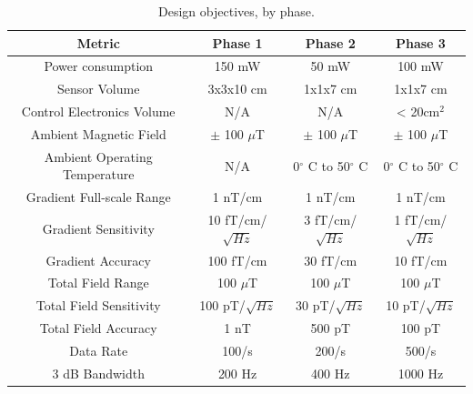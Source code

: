 \begin{table}[h!]
\centering
  \begin{tabular}{|c||c|c|c|}
    \hline
    Metric & Phase 1 & Phase 2 & Phase 3 \\
    \hline
    \hline
    Power consumption & 150 mW & 50 mW & 100 mW \\
    \hline
    Sensor Volume & 3x3x10 cm & 1x1x7 cm & 1x1x7 cm \\
    \hline
    Control Electronics Volume  & N/A & N/A & < 20cm$^2$ \\
    \hline
    Ambient Magnetic Field & $\pm$ 100 $\mu$T & $\pm$ 100 $\mu$T & $\pm$ 100 $\mu$T \\
    \hline
    Ambient Operating Temperature & N/A & 0$^{\circ}$ C to 50$^{\circ}$ C & 0$^{\circ}$ C to 50$^{\circ}$ C \\
    \hline
    Gradient Full-scale Range & 1 nT/cm & 1 nT/cm & 1 nT/cm \\
    \hline
    Gradient Sensitivity & 10 fT/cm/$\sqrt{Hz}$ & 3 fT/cm/$\sqrt{Hz}$  & 1 fT/cm/$\sqrt{Hz}$ \\
    \hline
    Gradient Accuracy & 100 fT/cm & 30 fT/cm & 10 fT/cm \\
    \hline
    Total Field Range & 100 $\mu$T & 100 $\mu$T & 100 $\mu$T \\
    \hline
    Total Field Sensitivity & 100 pT/$\sqrt{Hz}$ & 30 pT/$\sqrt{Hz}$  &  10 pT/$\sqrt{Hz}$ \\
    \hline
    Total Field Accuracy & 1 nT & 500 pT & 100 pT \\
    \hline
    Data Rate & 100/s & 200/s & 500/s \\
    \hline
    3 dB Bandwidth & 200 Hz & 400 Hz & 1000 Hz\\
    \hline
  \end{tabular}
\caption{Design objectives, by phase.}
\label{table:obj}
\end{table}


